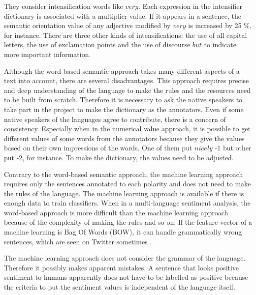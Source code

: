 They consider intensification words like $very$.
Each expression in the intensifier dictionary is associated with a multiplier value.
If it appears in a sentence, the semantic orientation value of any adjective modified by $very$ is increased by 25 \%, for instance. 
There are three other kinds of intensifications: the use of all capital letters, the use of exclamation points and the use of discourse $but$ to indicate more important information.

Although the word-based semantic approach takes many different aspects of a text into account, there are several disadvantages.
This approach requires precise and deep understanding of the language to make the rules and the resources need to be built from scratch.
Therefore it is necessary to ask the native speakers to take part in the project to make the dictionary as the annotators.
Even if some native speakers of the languages agree to contribute, there is a concern of consistency.
Especially when in the numerical value approach, it is possible to get different values of some words from the annotators because they give the values based on their own impressions of the words.
One of them put $nicely$ -1 but other put -2, for instance.
To make the dictionary, the values need to be adjusted.


Contrary to the word-based semantic approach, the machine learning approach requires only the sentences annotated to each polarity and does not need to make the rules of the language.
The machine learning approach is available if there is enough data to train classifiers.
When in a multi-language sentiment analysis, the word-based approach is more difficult than the machine learning approach because of the complexity of making the rules and so on.
If the feature vector of a machine learning is Bag Of Words (BOW), it can handle grammatically wrong sentences, which are seen on Twitter sometimes .


The machine learning approach does not consider the grammar of the language.
Therefore it possibly makes apparent mistakes.
A sentence that looks positive sentiment to humans apparently does not have to be labelled as positive because the criteria to put the sentiment values is independent of the language itself.



